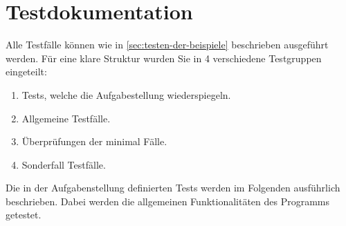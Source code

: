 \chapter{Testdokumentation}\label{ch:testdokumentation}
Alle Testfälle können wie in \ref{sec:testen-der-beispiele} beschrieben ausgeführt werden.
Für eine klare Struktur wurden Sie in 4 verschiedene Testgruppen eingeteilt:
\begin{enumerate}[label={\textbf{Gruppe~\arabic*:}}, ref={Gruppe~\arabic*}, leftmargin=*, noitemsep]
    \label{enm:tesgruppen}
    \item Tests, welche die Aufgabestellung wiederspiegeln.
    \item Allgemeine Testfälle.
    \item Überprüfungen der minimal Fälle.
    \item Sonderfall Testfälle.
\end{enumerate}

Die in der Aufgabenstellung definierten Tests werden im Folgenden ausführlich beschrieben.
Dabei werden die allgemeinen Funktionalitäten des Programms getestet.

